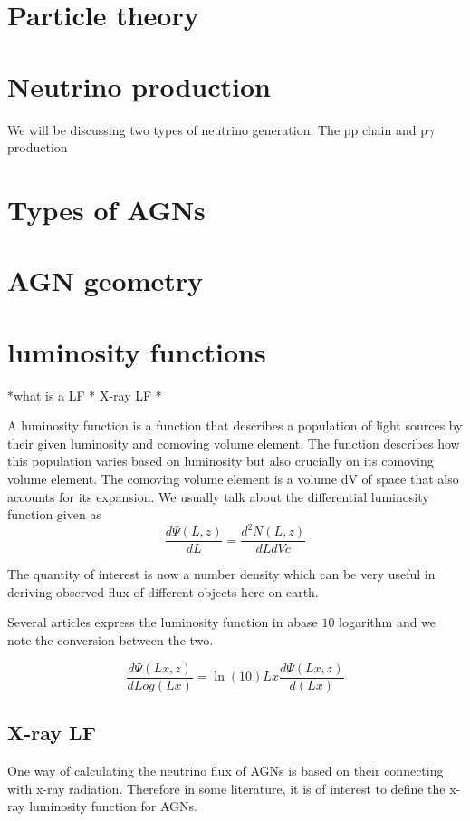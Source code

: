 \documentclass[11pt]{article}
\begin{document}
\section{Particle theory}

\section{Neutrino production}

We will be discussing two types of neutrino generation. The pp chain and p$\gamma$ production
\section{Types of AGNs}
\section{AGN geometry}

\section{ luminosity functions}

*what is a LF
* X-ray LF 
* 





A luminosity function is a function that describes a population of light sources by their given luminosity and comoving volume element. The function describes how this population varies based on luminosity but also crucially on its comoving volume element. The comoving volume element is a volume dV of space that also accounts for its expansion. We usually talk about the differential luminosity function given as
\begin{equation}
    \frac{d\Psi(L,z)}{dL} = \frac{d^2N(L,z)}{dLdVc}
\end{equation}

The quantity of interest is now a number density which can be very useful in deriving observed flux of different objects here on earth. 

Several articles express the luminosity function in abase $10$ logarithm and we note the conversion between the two. 

\begin{equation}
    \frac{d\Psi(Lx,z)}{dLog(Lx)} =  \ln (10)  Lx \frac{d\Psi(Lx,z)}{d(Lx)}
\end{equation}

\subsection{X-ray LF}
One way of calculating the neutrino flux of AGNs is based on their connecting with x-ray radiation. Therefore in some literature, it is of interest to define the x-ray luminosity function for AGNs.
\end{document}
